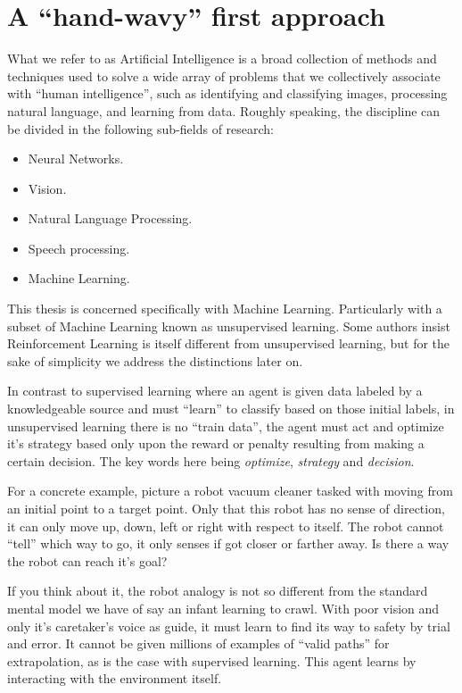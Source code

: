 \section{A ``hand-wavy'' first approach}

What we refer to as Artificial Intelligence is a broad collection of 
methods and techniques used to solve a wide array of problems that we 
collectively associate with ``human intelligence'', such as 
identifying and classifying images, processing natural language, and 
learning from data. Roughly speaking, the discipline can be divided in 
the following sub-fields of research:

\begin{itemize}
	\item Neural Networks.
	\item Vision.
	\item Natural Language Processing.
	\item Speech processing.
	\item Machine Learning.
\end{itemize}

This thesis is concerned specifically with Machine Learning.  
Particularly with a subset of Machine Learning known as unsupervised 
learning.  Some authors \cite{SuttonBarto} insist Reinforcement 
Learning is itself different from unsupervised learning, but for the 
sake of simplicity we address the distinctions later on.

In contrast to supervised learning where an agent is given data 
labeled by a knowledgeable source and must ``learn'' to classify based 
on those initial labels, in unsupervised learning there is no ``train 
data'', the agent must act and optimize it's strategy based only upon 
the reward or penalty resulting from making a certain decision. The 
key words here being \textit{optimize}, \textit{strategy} and 
\textit{decision}.

For a concrete example, picture a robot vacuum cleaner tasked with 
moving from an initial point to a target point.  Only that this robot 
has no sense of direction, it can only move up, down, left or right 
with respect to itself. The robot cannot ``tell'' which way to go, it 
only senses if got closer or farther away. Is there a way the robot 
can reach it's goal?

If you think about it, the robot analogy is not so different from the 
standard mental model we have of say an infant learning to crawl. With 
poor vision and only it's caretaker's voice as guide, it must learn to 
find its way to safety by trial and error. It cannot be given millions 
of examples of ``valid paths'' for extrapolation, as is the case with 
supervised learning. This agent learns by interacting with the 
environment itself.

